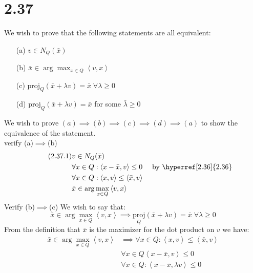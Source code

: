 \documentclass[]{article}
\begin{document}
\section*{2.37}
    We wish to prove that the following statements are all equivalent: 
    \begin{enumerate}
        \item[(a)] $v \in N_Q(\bar{x})$
        \item[(b)] $\bar{x} \in \arg\max_{x \in Q} \left\langle v, x \right\rangle$
        \item[(c)] $\text{proj}_Q(\bar{x} + \lambda v) = \bar{x} \;\forall \lambda \ge 0$
        \item[(d)]  $\text{proj}_Q(\bar{x} + \lambda v) = \bar{x}$ for some $\bar{\lambda} \ge 0$
    \end{enumerate}
    We wish to prove $(a)\implies (b) \implies (c)\implies (d)\implies (a)$ to show the equivalence of the statement. 
    \\[1.1em]
    verify (a)$\implies$(b)
    \begin{align*}\tag{2.37.1}\label{eqn:2.37.1}
        & v \in N_Q(\bar{x}) & \\
        & \forall x \in Q: \left\langle x - \bar{x} , v\right\rangle \le 0 & \text{ by \hyperref[2.36]{2.36}}
        \\
        &\forall x \in Q: \left\langle x, v \right\rangle \le \left\langle \bar{x}, v \right\rangle & 
        \\
        & \bar{x} \in \arg\max_{x \in Q} \left\langle v, x \right\rangle& 
    \end{align*}
    Verify (b)$\implies$(c)
        We wish to say that: 
        $$
            \bar{x} \in \arg\max_{x \in Q} \left\langle v, x \right\rangle
            \implies 
            \underset{Q}{\text{proj}}(\bar{x} + \lambda v) = \bar{x} \;\forall \lambda \ge 0
        $$
        From the definition that $\bar{x}$ is the maximizer for the dot product on $v$ we have: 
        \begin{align*}\tag{2.37.2}\label{eqn:2.37.2}
            \bar{x} \in \arg\max_{x \in Q} \left\langle v, x \right\rangle &\implies 
            \forall x \in Q: \left\langle x, v \right\rangle \le \left\langle \bar{x}, v\right\rangle
            \\
            & \forall x \in Q \left\langle x - \bar{x}, v \right\rangle \le 0
            \\
            & \forall x \in Q: \left\langle x - \bar{x}, \lambda v \right\rangle \le 0
        \end{align*}
\end{document}
